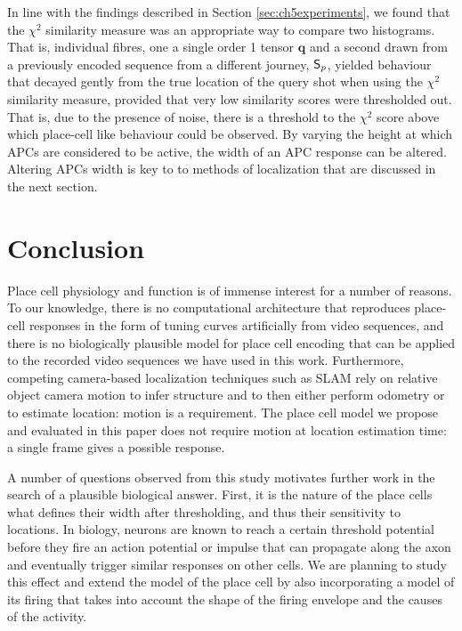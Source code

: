 In line with the findings described in Section \ref{sec:ch5experiments}, we found that the $\chi^2$ similarity measure was an appropriate way to compare two histograms. That is, individual fibres, one a single order 1 tensor $\mathbf{q}$ and a second drawn from a previously encoded sequence from a different journey, $\mathsf{S}_p$, yielded behaviour that decayed gently from the true location of the query shot when using the $\chi^2$ similarity measure, provided that very low similarity scores were thresholded out.  That is, due to the presence of noise, there is a threshold to the $\chi^2$ score above which place-cell like behaviour could be observed.  By varying the height at which APCs are considered to be active, the width of an APC response can be altered.  Altering APCs width is key to to methods of localization that are discussed in the next section.  



\section{Conclusion}

Place cell physiology and function is of immense interest for a number of reasons. To our knowledge, there is no computational architecture that reproduces place-cell responses in the form of tuning curves artificially from video sequences, and there is no biologically plausible model for place cell encoding that can be applied to the recorded video sequences we have used in this work.  Furthermore, competing camera-based localization techniques such as SLAM rely on relative object camera motion to infer structure and to then either perform odometry or to estimate location: motion is a requirement.  The place cell model we propose and evaluated in this paper does not require motion at location estimation time: a single frame gives a possible response.

A number of questions observed from this study motivates further work in the search of a plausible biological answer. First, it is the nature of the place cells what defines their width after thresholding, and thus their sensitivity to locations. In biology, neurons are known to reach a certain threshold potential before they fire an action potential or impulse that can propagate along the axon and eventually trigger similar responses on other cells. We are planning to study this effect and extend the model of the place cell by also incorporating a model of its firing that takes into account the shape of the firing envelope and the causes of the activity.


